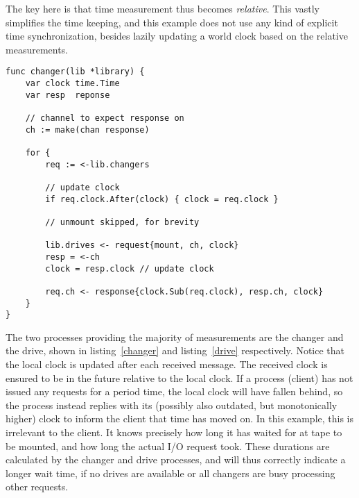 The key here is that time measurement thus becomes \emph{relative}. This vastly
simplifies the time keeping, and this example does not use any kind of
explicit time synchronization, besides lazily updating a world clock based on
the relative measurements.

\begin{lstlisting}[caption={Tape media changer},label=changer]
func changer(lib *library) {
    var clock time.Time
    var resp  reponse

    // channel to expect response on
    ch := make(chan response)

    for {
        req := <-lib.changers

        // update clock
        if req.clock.After(clock) { clock = req.clock }

        // unmount skipped, for brevity

        lib.drives <- request{mount, ch, clock}
        resp = <-ch
        clock = resp.clock // update clock

        req.ch <- response{clock.Sub(req.clock), resp.ch, clock}
    }
}
\end{lstlisting}


The two processes providing the majority of measurements are the changer and
the drive, shown in listing~\ref{changer} and listing~\ref{drive} respectively.
Notice that the local clock is updated after each received message.
The received clock is ensured to be in the future relative to the local clock.
If a process (client) has not issued any requests for a period time, the local
clock will have fallen behind, so the process instead replies with its
(possibly also outdated, but monotonically higher) clock to inform the client
that time has moved on. In this example, this is irrelevant to the client. It
knows precisely how long it has waited for at tape to be mounted, and how long
the actual I/O request took. These durations are calculated by the changer and
drive processes, and will thus correctly indicate a longer wait time, if no
drives are available or all changers are busy processing other requests.


